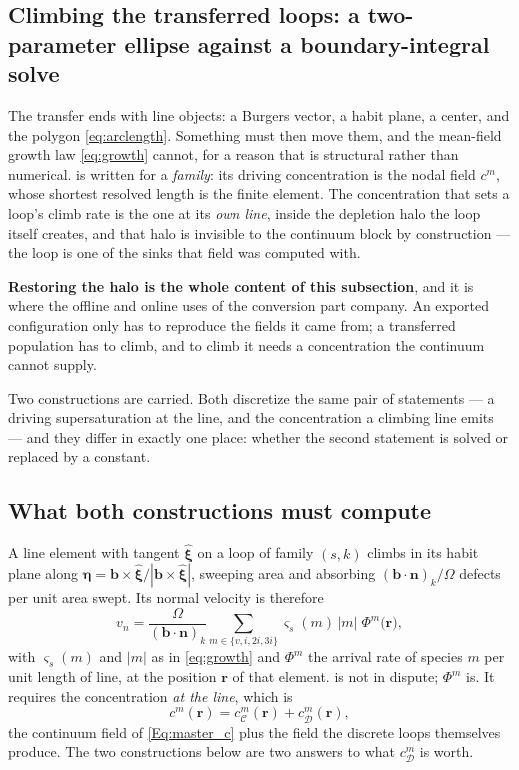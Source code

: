 \documentclass{article}
\newcommand{\bvec}{\bm b}
\newcommand{\nvec}{\bm n}
\begin{document}
\subsection{Climbing the transferred loops: a two-parameter ellipse against a
boundary-integral solve}
\label{sec:rom-vs-bim}

The transfer ends with line objects: a Burgers vector, a habit plane, a center,
and the polygon \cref{eq:arclength}. Something must then move them, and the
mean-field growth law \cref{eq:growth} cannot, for a reason that is structural
rather than numerical.  is written for a \emph{family}: its
driving concentration is the nodal field $c^m$, whose shortest resolved length is
the finite element. The concentration that sets a loop's climb rate is the one at
its \emph{own line}, inside the depletion halo the loop itself creates, and that
halo is invisible to the continuum block by construction --- the loop is one of
the sinks that field was computed with.

\textbf{Restoring the halo is the whole content of this subsection}, and it is
where the offline and online uses of the conversion part company. An exported
configuration only has to reproduce the fields it came from; a transferred
population has to climb, and to climb it needs a concentration the continuum
cannot supply.

Two constructions are carried. Both discretize the same pair of statements --- a
driving supersaturation at the line, and the concentration a climbing line emits
--- and they differ in exactly one place: whether the second statement is solved
or replaced by a constant.

\subsection{What both constructions must compute}
\label{sec:climb-common}

A line element with tangent $\hat{\bm\xi}$ on a loop of family $(s,k)$ climbs in
its habit plane along $\hat{\bm\eta}=\bvec\times\hat{\bm\xi}/|\bvec\times
\hat{\bm\xi}|$, sweeping area and absorbing $(\bvec\!\cdot\!\nvec)_k/\Omega$
defects per unit area swept. Its normal velocity is therefore
\begin{equation}
  v_n=\frac{\Omega}{(\bvec\!\cdot\!\nvec)_k}
      \sum_{m\in\{v,i,2i,3i\}}\varsigma_s(m)\,|m|\;\Phi^m\bigl(\bm r\bigr),
  \label{eq:vn-common}
\end{equation}
with $\varsigma_s(m)$ and $|m|$ as in \cref{eq:growth} and $\Phi^m$ the arrival
rate of species $m$ per unit length of line, at the position $\bm r$ of that
element.  is not in dispute; $\Phi^m$ is. It requires the
concentration \emph{at the line}, which is
\begin{equation}
  c^m(\bm r)=c^m_{\mathcal C}(\bm r)+c^m_{\mathcal D}(\bm r),
  \label{eq:superposition}
\end{equation}
the continuum field of \cref{Eq:master_c} plus the field the discrete loops
themselves produce. The two constructions below are two answers to what
$c^m_{\mathcal D}$ is worth.
\end{document}
